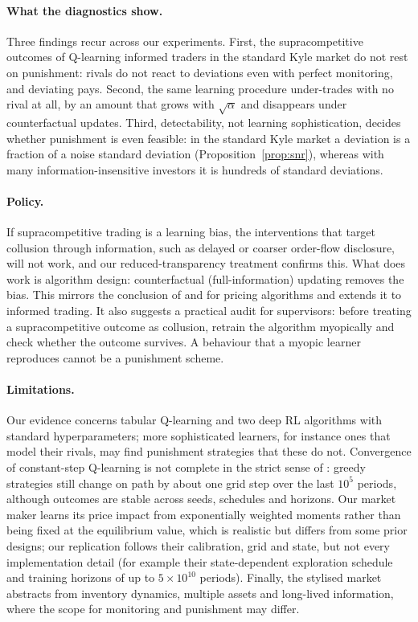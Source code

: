 \paragraph{What the diagnostics show.} Three findings recur across our
experiments. First, the supracompetitive outcomes of Q-learning informed
traders in the standard Kyle market do not rest on punishment: rivals do not
react to deviations even with perfect monitoring, and deviating pays. Second,
the same learning procedure under-trades with no rival at all, by an amount
that grows with $\sqrt\alpha$ and disappears under counterfactual updates.
Third, detectability, not learning sophistication, decides whether punishment
is even feasible: in the standard Kyle market a deviation is a fraction of a
noise standard deviation (Proposition~\ref{prop:snr}), whereas with many
information-insensitive investors it is hundreds of standard deviations.

\paragraph{Policy.} If supracompetitive trading is a learning bias, the
interventions that target collusion through information, such as delayed or
coarser order-flow disclosure, will not work, and our reduced-transparency
treatment confirms this. What does work is algorithm design:
counterfactual (full-information) updating removes the bias. This mirrors the
conclusion of \citet{asker2022,asker2024} and \citet{abada2023} for pricing
algorithms and extends it to informed trading. It also suggests a practical
audit for supervisors: before treating a supracompetitive outcome as
collusion, retrain the algorithm myopically and check whether the outcome
survives. A behaviour that a myopic learner reproduces cannot be a punishment
scheme.

\paragraph{Limitations.} Our evidence concerns tabular Q-learning and two deep
RL algorithms with standard hyperparameters; more sophisticated learners, for
instance ones that model their rivals, may find punishment strategies that
these do not. Convergence of constant-step Q-learning is not complete in the
strict sense of \citet{calvano2020}: greedy strategies still change on path by
about one grid step over the last $10^5$ periods, although outcomes are stable
across seeds, schedules and horizons. Our market maker learns its price impact
from exponentially weighted moments rather than being fixed at the
equilibrium value, which is realistic but differs from some prior designs; our
\citet{dou2025} replication follows their calibration, grid and state, but not
every implementation detail (for example their state-dependent exploration
schedule and training horizons of up to $5\times10^{10}$ periods). Finally,
the stylised market abstracts from inventory dynamics, multiple assets and
long-lived information, where the scope for monitoring and punishment may
differ.

